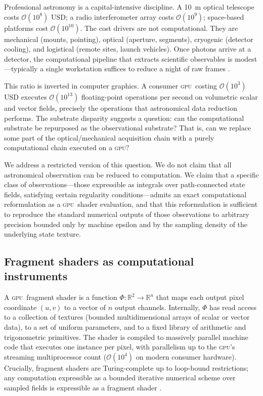 \documentclass[11pt,twocolumn,a4paper]{article}
\theoremstyle{definition}
\theoremstyle{remark}
\newcommand{\gpu}{\textsc{gpu}}
\begin{document}
Professional astronomy is a capital-intensive discipline. A 10~m optical telescope costs $\mathcal{O}(10^8)$ USD; a radio interferometer array costs $\mathcal{O}(10^9)$; space-based platforms cost $\mathcal{O}(10^{10})$. The cost drivers are not computational. They are mechanical (mounts, pointing), optical (aperture, segments), cryogenic (detector cooling), and logistical (remote sites, launch vehicles). Once photons arrive at a detector, the computational pipeline that extracts scientific observables is modest---typically a single workstation suffices to reduce a night of raw frames \citep{astropy2013,astropy2018}.

This ratio is inverted in computer graphics. A consumer \gpu\ costing $\mathcal{O}(10^3)$ USD executes $\mathcal{O}(10^{13})$ floating-point operations per second on volumetric scalar and vector fields, precisely the operations that astronomical data reduction performs. The substrate disparity suggests a question: can the computational substrate be repurposed as the observational substrate? That is, can we replace some part of the optical/mechanical acquisition chain with a purely computational chain executed on a \gpu?

We address a restricted version of this question. We do not claim that all astronomical observation can be reduced to computation. We claim that a specific class of observations---those expressible as integrals over path-connected state fields, satisfying certain regularity conditions---admits an exact computational reformulation as a \gpu\ shader evaluation, and that this reformulation is sufficient to reproduce the standard numerical outputs of those observations to arbitrary precision bounded only by machine epsilon and by the sampling density of the underlying state texture.

\subsection{Fragment shaders as computational instruments}

A \gpu\ fragment shader is a function $\Phi : \mathbb{R}^2 \to \mathbb{R}^n$ that maps each output pixel coordinate $(u,v)$ to a vector of $n$ output channels. Internally, $\Phi$ has read access to a collection of textures (bounded multidimensional arrays of scalar or vector data), to a set of uniform parameters, and to a fixed library of arithmetic and trigonometric primitives. The shader is compiled to massively parallel machine code that executes one instance per pixel, with parallelism up to the \gpu's streaming multiprocessor count ($\mathcal{O}(10^4)$ on modern consumer hardware). Crucially, fragment shaders are Turing-complete up to loop-bound restrictions; any computation expressible as a bounded iterative numerical scheme over sampled fields is expressible as a fragment shader \citep{akenine2018,pharr2016}.
\end{document}
